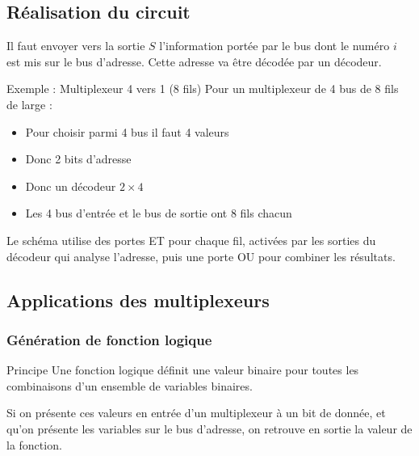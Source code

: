 \documentclass[a4paper,12pt]{article}
\begin{document}
\subsection{Réalisation du circuit}

Il faut envoyer vers la sortie $S$ l'information portée par le bus dont le numéro $i$ est mis sur le bus d'adresse. Cette adresse va être décodée par un décodeur.

\begin{examplebox}{Exemple : Multiplexeur 4 vers 1 (8 fils)}
Pour un multiplexeur de 4 bus de 8 fils de large :
\begin{itemize}
    \item Pour choisir parmi 4 bus il faut 4 valeurs
    \item Donc 2 bits d'adresse
    \item Donc un décodeur $2 \times 4$
    \item Les 4 bus d'entrée et le bus de sortie ont 8 fils chacun
\end{itemize}

Le schéma utilise des portes ET pour chaque fil, activées par les sorties du décodeur qui analyse l'adresse, puis une porte OU pour combiner les résultats.
\end{examplebox}

\subsection{Applications des multiplexeurs}

\subsubsection{Génération de fonction logique}

\begin{propbox}{Principe}
Une fonction logique définit une valeur binaire pour toutes les combinaisons d'un ensemble de variables binaires. 

Si on présente ces valeurs en entrée d'un multiplexeur à un bit de donnée, et qu'on présente les variables sur le bus d'adresse, on retrouve en sortie la valeur de la fonction.
\end{propbox}
\end{document}
